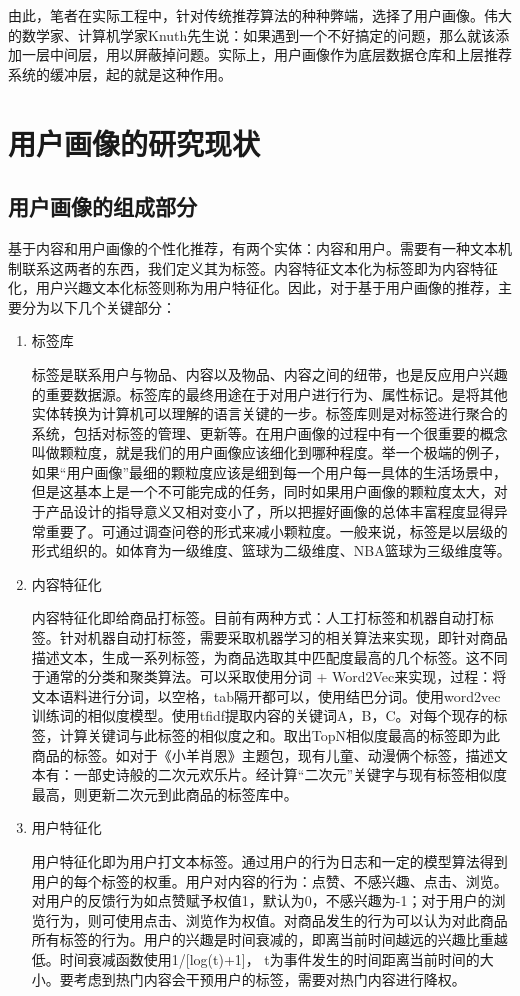 	由此，笔者在实际工程中，针对传统推荐算法的种种弊端，选择了用户画像。伟大的数学家、计算机学家Knuth先生说：如果遇到一个不好搞定的问题，那么就该添加一层中间层，用以屏蔽掉问题。实际上，用户画像作为底层数据仓库和上层推荐系统的缓冲层，起的就是这种作用。

	\section{用户画像的研究现状}
		\subsection{用户画像的组成部分}
		基于内容和用户画像的个性化推荐，有两个实体：内容和用户。需要有一种文本机制联系这两者的东西，我们定义其为标签。内容特征文本化为标签即为内容特征化，用户兴趣文本化标签则称为用户特征化\citep{user-profile,user-profile1,user-profile2,user-profile3,user-profile4}。因此，对于基于用户画像的推荐，主要分为以下几个关键部分：
		\begin{enumerate}[(1)]
		\item 标签库

		标签是联系用户与物品、内容以及物品、内容之间的纽带，也是反应用户兴趣的重要数据源。标签库的最终用途在于对用户进行行为、属性标记。是将其他实体转换为计算机可以理解的语言关键的一步。标签库则是对标签进行聚合的系统，包括对标签的管理、更新等。在用户画像的过程中有一个很重要的概念叫做颗粒度，就是我们的用户画像应该细化到哪种程度。举一个极端的例子，如果“用户画像”最细的颗粒度应该是细到每一个用户每一具体的生活场景中，但是这基本上是一个不可能完成的任务，同时如果用户画像的颗粒度太大，对于产品设计的指导意义又相对变小了，所以把握好画像的总体丰富程度显得异常重要了。可通过调查问卷的形式来减小颗粒度。一般来说，标签是以层级的形式组织的。如体育为一级维度、篮球为二级维度、NBA篮球为三级维度等。

		\item 内容特征化

		内容特征化即给商品打标签。目前有两种方式：人工打标签和机器自动打标签。针对机器自动打标签，需要采取机器学习的相关算法来实现，即针对商品描述文本，生成一系列标签，为商品选取其中匹配度最高的几个标签。这不同于通常的分类和聚类算法\citep{recmd-kmeans}。可以采取使用分词 + Word2Vec来实现，过程：将文本语料进行分词，以空格，tab隔开都可以，使用结巴分词。使用word2vec训练词的相似度模型。使用tfidf提取内容的关键词A，B，C。对每个现存的标签，计算关键词与此标签的相似度之和。取出TopN相似度最高的标签即为此商品的标签。如对于《小羊肖恩》主题包，现有儿童、动漫俩个标签，描述文本有：一部史诗般的二次元欢乐片。经计算“二次元”关键字与现有标签相似度最高，则更新二次元到此商品的标签库中。

		\item 用户特征化

		用户特征化即为用户打文本标签。通过用户的行为日志和一定的模型算法得到用户的每个标签的权重。用户对内容的行为：点赞、不感兴趣、点击、浏览。对用户的反馈行为如点赞赋予权值1，默认为0，不感兴趣为-1；对于用户的浏览行为，则可使用点击、浏览作为权值。对商品发生的行为可以认为对此商品所有标签的行为。用户的兴趣是时间衰减的，即离当前时间越远的兴趣比重越低。时间衰减函数使用1/[log(t)+1]， t为事件发生的时间距离当前时间的大小。要考虑到热门内容会干预用户的标签，需要对热门内容进行降权。
		\end{enumerate}

